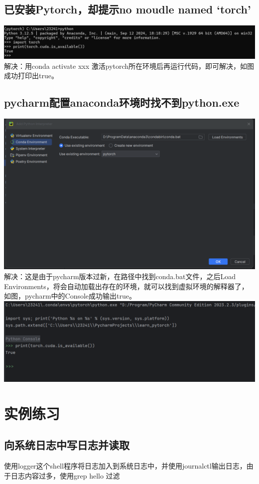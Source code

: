 \documentclass[UTF8,a4paper]{ctexart}
\begin{document}
\begin{sloppypar}
	\subsection{已安装Pytorch，却提示no moudle named ‘torch’}
	\includegraphics[width = 16cm]{q1}
	解决：用conda activate xxx 激活pytorch所在环境后再运行代码，即可解决，如图成功打印出true。
	\subsection{pycharm配置anaconda环境时找不到python.exe}
	\includegraphics[width = 16cm]{q2}
	解决：这是由于pycharm版本过新，在路径中找到conda.bat文件，之后Load Environments，将会自动加载出存在的环境，就可以找到虚拟环境的解释器了，如图，pycharm中的Console成功输出true。
	\includegraphics[width = 16cm]{q3}
	
	\newpage
	
	\section{实例练习}
	\subsection{向系统日志中写日志并读取}
	使用logger这个shell程序将日志加入到系统日志中，并使用journalctl输出日志，由于日志内容过多，使用grep hello 过滤


\end{sloppypar}
\end{document}
